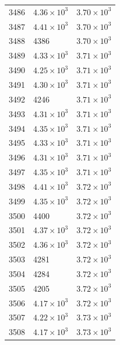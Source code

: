 \begin{table}[H]
\begin{tabular}{lll}
3486 & $\displaystyle 4.36 \times 10^{3}$ & $\displaystyle 3.70 \times 10^{3}$ \\
3487 & $\displaystyle 4.41 \times 10^{3}$ & $\displaystyle 3.70 \times 10^{3}$ \\
3488 & 4386 & $\displaystyle 3.70 \times 10^{3}$ \\
3489 & $\displaystyle 4.33 \times 10^{3}$ & $\displaystyle 3.71 \times 10^{3}$ \\
3490 & $\displaystyle 4.25 \times 10^{3}$ & $\displaystyle 3.71 \times 10^{3}$ \\
3491 & $\displaystyle 4.30 \times 10^{3}$ & $\displaystyle 3.71 \times 10^{3}$ \\
3492 & 4246 & $\displaystyle 3.71 \times 10^{3}$ \\
3493 & $\displaystyle 4.31 \times 10^{3}$ & $\displaystyle 3.71 \times 10^{3}$ \\
3494 & $\displaystyle 4.35 \times 10^{3}$ & $\displaystyle 3.71 \times 10^{3}$ \\
3495 & $\displaystyle 4.33 \times 10^{3}$ & $\displaystyle 3.71 \times 10^{3}$ \\
3496 & $\displaystyle 4.31 \times 10^{3}$ & $\displaystyle 3.71 \times 10^{3}$ \\
3497 & $\displaystyle 4.35 \times 10^{3}$ & $\displaystyle 3.71 \times 10^{3}$ \\
3498 & $\displaystyle 4.41 \times 10^{3}$ & $\displaystyle 3.72 \times 10^{3}$ \\
3499 & $\displaystyle 4.35 \times 10^{3}$ & $\displaystyle 3.72 \times 10^{3}$ \\
3500 & 4400 & $\displaystyle 3.72 \times 10^{3}$ \\
3501 & $\displaystyle 4.37 \times 10^{3}$ & $\displaystyle 3.72 \times 10^{3}$ \\
3502 & $\displaystyle 4.36 \times 10^{3}$ & $\displaystyle 3.72 \times 10^{3}$ \\
3503 & 4281 & $\displaystyle 3.72 \times 10^{3}$ \\
3504 & 4284 & $\displaystyle 3.72 \times 10^{3}$ \\
3505 & 4205 & $\displaystyle 3.72 \times 10^{3}$ \\
3506 & $\displaystyle 4.17 \times 10^{3}$ & $\displaystyle 3.72 \times 10^{3}$ \\
3507 & $\displaystyle 4.22 \times 10^{3}$ & $\displaystyle 3.73 \times 10^{3}$ \\
3508 & $\displaystyle 4.17 \times 10^{3}$ & $\displaystyle 3.73 \times 10^{3}$ \\

\end{tabular}
\end{table}
